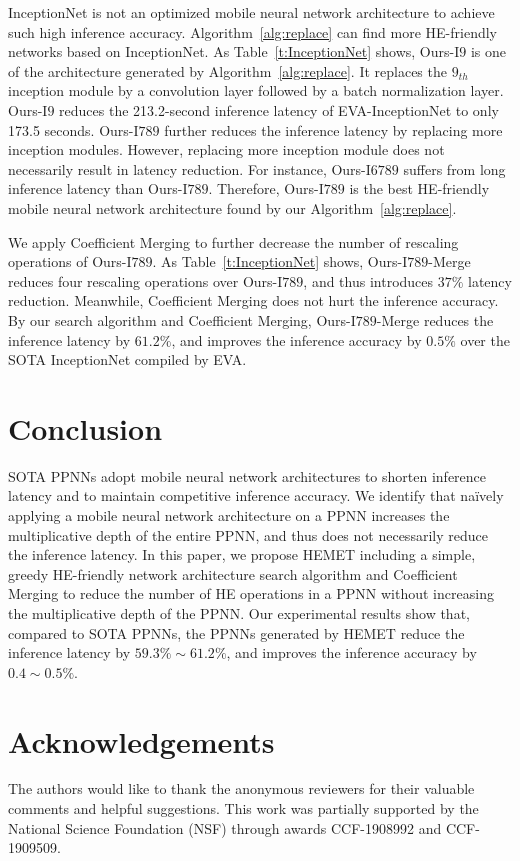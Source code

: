 \documentclass{article}
\begin{document}
InceptionNet is not an optimized mobile neural network architecture to achieve such high inference accuracy. Algorithm~\ref{alg:replace} can find more HE-friendly networks based on InceptionNet. As Table~\ref{t:InceptionNet} shows, Ours-I$9$ is one of the architecture generated by Algorithm~\ref{alg:replace}. It replaces the $9_{th}$ inception module by a convolution layer followed by a batch normalization layer. Ours-I$9$ reduces the 213.2-second inference latency of EVA-InceptionNet to only 173.5 seconds. Ours-I$789$ further reduces the inference latency by replacing more inception modules. However, replacing more inception module does not necessarily result in latency reduction. For instance, Ours-I$6789$ suffers from long inference latency than Ours-I$789$. Therefore, Ours-I$789$ is the best HE-friendly mobile neural network architecture found by our Algorithm~\ref{alg:replace}.

We apply Coefficient Merging to further decrease the number of rescaling operations of Ours-I$789$. As Table~\ref{t:InceptionNet} shows, Ours-I$789$-Merge reduces four rescaling operations over Ours-I$789$, and thus introduces $37\%$ latency reduction. Meanwhile, Coefficient Merging does not hurt the inference accuracy. By our search algorithm and Coefficient Merging, Ours-I$789$-Merge reduces the inference latency by $61.2\%$, and improves the inference accuracy by $0.5\%$ over the SOTA InceptionNet compiled by EVA.

	


\section{Conclusion}


SOTA PPNNs adopt mobile neural network architectures to shorten inference latency and to maintain competitive inference accuracy. We identify that na\"ively applying a mobile neural network architecture on a PPNN increases the multiplicative depth of the entire PPNN, and thus does not necessarily reduce the inference latency. In this paper, we propose HEMET including a simple, greedy HE-friendly network architecture search algorithm and Coefficient Merging to reduce the number of HE operations in a PPNN without increasing the multiplicative depth of the PPNN. Our experimental results show that, compared to SOTA PPNNs, the PPNNs generated by HEMET reduce the inference latency by $59.3\%\sim 61.2\%$, and improves the inference accuracy by $0.4 \sim 0.5\%$.
	
	
	
	
	
	
	
	
\section*{Acknowledgements}
The authors would like to thank the anonymous reviewers for their valuable comments and helpful suggestions. This work was partially supported by the National Science Foundation (NSF) through awards CCF-1908992 and CCF-1909509.
	
	
	
	


	
\end{document}
